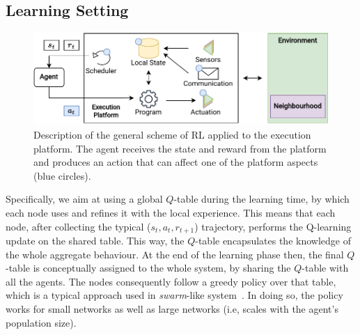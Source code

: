 \subsection{Learning Setting}\label{acsos2022:sec:learning-setting}

\begin{figure}
	\centering
    \includegraphics[width=\linewidth]{papers/acsos2022/img//rl-architecture.pdf}
    \caption[Description of the general scheme of \ac{RL} applied to the execution platform.]{Description of the general scheme of \ac{RL} applied to the execution platform. 
    The agent receives the state and reward from the platform and produces an action that can affect one of the platform aspects (blue circles).}
    \label{acsos2022:fig:rl-and-ac}
\end{figure}
Specifically, we aim at using a global $Q$-table during the learning time, 
 by which each node uses and refines it with the local experience.
This means that each node, after collecting the typical ($s_t, a_t, r_{t+1}$) trajectory,
 performs the Q-learning update on the shared table.
%
 This way, the $Q$-table encapsulates the knowledge of the whole aggregate behaviour.
%
At the end of the learning phase then, 
 the final $Q$-table is conceptually assigned to the whole system, by sharing the $Q$-table with all the agents.
%
 The nodes consequently follow a greedy policy over that table, 
 which is a typical approach used in \emph{swarm}-like system~\cite{DBLP:journals/jmlr/HuttenrauchSN19, DBLP:conf/atal/SosicKZK17}.
%
In doing so, the policy works for small networks as well as large networks  (i.e, scales with the agent's population size).

